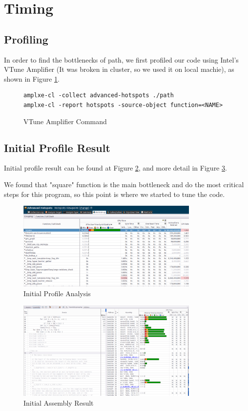 \section{Timing}\label{sec:timing}
\subsection{Profiling}
In order to find the bottlenecks of path, we first profiled our code
using Intel's VTune Amplifier (It was broken in cluster, so we used
it on local machie), as shown in Figure \ref{amplxe-command}.

\begin{figure}[H]
\footnotesize
\begin{verbatim}
amplxe-cl -collect advanced-hotspots ./path
amplxe-cl -report hotspots -source-object function=<NAME>
\end{verbatim}
\caption{VTune Amplifier Command}
\label{amplxe-command}
\end{figure}

\subsection{Initial Profile Result}
Initial profile result can be found at Figure \ref{initial_profile_result_0},
and more detail in Figure \ref{initial_profile_result_1}.

We found that "square" function is the main bottleneck and do the most critical
steps for this program, so this point is where we started to tune the code.

\begin{figure}[H]
    \centering
    \includegraphics[width=0.8\textwidth]{figs/0_analysis.png}
    \caption{Initial Profile Analysis}
    \label{initial_profile_result_0}
\end{figure}

\begin{figure}[H]
    \centering
    \includegraphics[width=0.8\textwidth]{figs/0_assembly.png}
    \caption{Initial Assembly Result}
    \label{initial_profile_result_1}
\end{figure}

